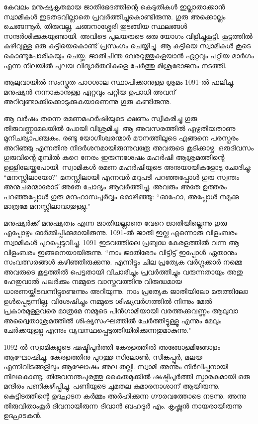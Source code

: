 \documentclass[12pt,openany]{book}
\begin{document}
	കേവലം മനുഷ്യകൃതമായ ജാതിഭേദത്തിന്റെ കെടുതികൾ ഇല്ലാതാക്കാൻ സ്വാമികൾ ഇടതടവില്ലാതെ പ്രവർത്തിച്ചുകൊണ്ടിരുന്നു. ഗുരു അക്കൊല്ലം ചെങ്ങന്നൂർ, തിരുവല്ല, ചങ്ങനാശ്ശേരി തുടങ്ങിയ സ്ഥലങ്ങൾ സന്ദർശിക്കുകയുണ്ടായി. അവിടെ പുലയരുടെ ഒരു യോഗം വിളിച്ചുകൂട്ടി. കൂട്ടത്തിൽ കഴിവുള്ള ഒരു കുട്ടിയെകൊണ്ട് പ്രസംഗം ചെയ്യിച്ചു. ആ കുട്ടിയെ സ്വാമികൾ കൂടെ കൊണ്ടുപോരികയും ചെയ്തു. ജാതിചിന്ത വേരറുത്തുകളയാൻ ഏറ്റവും പറ്റിയ മാർഗം എന്ന നിലയിൽ പുലയ വിദ്യാർത്ഥികളെ ചേർത്തു മിശ്രഭോജനം നടത്തി.
	
	ആലുവായിൽ സംസ്കൃത പാഠശാല സ്ഥാപിക്കാനുള്ള ശ്രമം 1091-ൽ ഫലിച്ചു. മനുഷ്യൻ നന്നാകാനുള്ള ഏറ്റവും പറ്റിയ ഉപാധി അവന് അറിവുണ്ടാക്കിക്കൊടുക്കുകയാണെന്നു ഗുരു കണ്ടിരുന്നു.
	
	ആ വർഷം തന്നെ രമണമഹർഷിയുടെ ക്ഷണം സ്വീകരിച്ചു ഗുരു തിരുവണ്ണാമലയിൽ പോയി വിശ്രമിച്ചു. ആ അവസരത്തിൽ എഴുതിയതാണു മുനിചര്യാപഞ്ചകം. രണ്ടു യോഗീശ്വരന്മാർ മൗനത്തിലൂടെ എങ്ങനെ പരസ്പരം അറിഞ്ഞു എന്നതിനു നിദർശനമായിരുന്നുവത്രേ അവരുടെ കൂടിക്കാഴ്ച. ഒരുദിവസം ഗുരുവിന്റെ മുമ്പിൽ കുറെ നേരം ഇരുന്നശേഷം മഹർഷി ആശ്രമത്തിന്റെ ഉള്ളിലേയ്ക്കുപോയി. സ്വാമികൾ രമണ മഹർഷിയുടെ അനുയായികളോടു ചോദിച്ചു: ``മനസ്സിലായോ?" മനസ്സിലായി എന്നവർ മറുപടി പറഞ്ഞപ്പോൾ ഗുരു സ്വന്തം അനുചരന്മാരോട് അതേ ചോദ്യം ആവർത്തിച്ചു. അവരും അതേ ഉത്തരം പറഞ്ഞപ്പോൾ ഗുരു മന്ദഹാസപൂർവ്വം മൊഴിഞ്ഞു: ``ഓഹോ, അപ്പോൾ നമുക്കു മാത്രമേ മനസ്സിലാവാതുള്ളു."
	
	മനുഷ്യർക്ക് മനുഷ്യത്വം എന്ന ജാതിയല്ലാതെ വേറെ ജാതിയില്ലെന്നു ഗുരു എപ്പോഴും ഓർമ്മിപ്പിക്കുമായിരുന്നു. 1091-ൽ ജാതി ഇല്ല എന്നൊരു വിളംബരം സ്വാമികൾ പുറപ്പെടുവിച്ചു. 1091 ഇടവത്തിലെ പ്രബുദ്ധ കേരളത്തിൽ വന്ന ആ വിളംബരം ഇങ്ങനെയായിരുന്നു. ``നാം ജാതിഭേദം വിട്ടിട്ട് ഇപ്പോൾ ഏതാനും സംവത്സരങ്ങൾ കഴിഞ്ഞിരുക്കുന്നു. എന്നിട്ടും ചില പ്രത്യേക വർഗ്ഗക്കാർ നമ്മെ അവരുടെ കൂട്ടത്തിൽ പെട്ടതായി വിചാരിച്ചും പ്രവർത്തിച്ചും വരുന്നതായും അതു ഹേതുവാൽ പലർക്കും നമ്മുടെ വാസ്തവത്തിനു വിരുദ്ധമായ ധാരണയ്ക്കിടവന്നിട്ടുണ്ടെന്നും അറിയുന്നു. നാം പ്രത്യേക ജാതിയിലോ മതത്തിലോ ഉൾപ്പെടുന്നില്ല. വിശേഷിച്ചും നമ്മുടെ ശിഷ്യവർഗത്തിൽ നിന്നും മേൽ പ്രകാരമുള്ളവരെ മാത്രമേ നമ്മുടെ പിൻഗാമിയായി വരത്തക്കവണ്ണം ആലുവാ അദ്വൈതാശ്രമത്തിൽ ശിഷ്യസംഘത്തിൽ ചേർത്തിട്ടുള്ളൂ എന്നും മേലും ചേർക്കയുള്ളൂ എന്നും വ്യവസ്ഥപ്പെടുത്തിയിരിക്കുന്നതുമാകുന്നു."
	
	1092-ൽ സ്വാമികളുടെ ഷഷ്ടിപൂർത്തി കേരളത്തിൽ അങ്ങോളമിങ്ങോളം ആഘോഷിച്ചു. കേരളത്തിനു പുറത്തു സിലോൺ, സിങ്കപ്പൂർ, മലയ എന്നിവിടങ്ങളിലും ആഘോഷം അല തല്ലി. സ്വാമി അന്നും നിർലിപ്തനായി നിലകൊണ്ടു. തിരുവനന്തപുരത്തു കൈതമുക്കിൽ ഷഷ്ടിപൂർത്തി സ്മാരകമായി ഒരു മന്ദിരം പണികഴിപ്പിച്ചു. പണിയുടെ ചുമതല കുമാരനാശാന് ആയിരുന്നു. കെട്ടിടത്തിന്റെ ഉദ്ഘാടന കർമ്മം അർഹിക്കുന്ന ഗൗരവത്തോടെ നടന്നു. അന്നു തിരുവിതാംകൂർ ദിവനായിരുന്ന ദിവാൻ ബഹദൂർ എം. കൃഷ്ണൻ നായരായിരുന്നു ഉദ്ഘാടകൻ.
	
\end{document}
